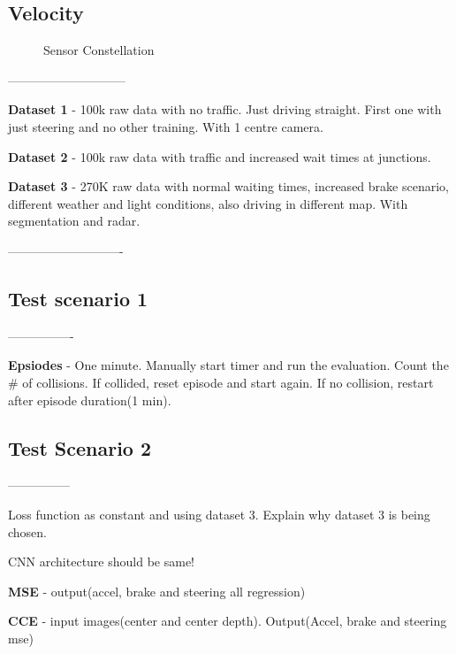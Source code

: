 \subsection{Velocity}






\begin{figure}
	\centering
    \def\svgwidth{\textwidth}
    \caption{Sensor Constellation}
    \label{fig:simplesensorconstellation}
\end{figure}

\iffalse
-----------------------------

\textbf{Dataset 1} - 100k raw data with no traffic. Just driving straight. First one with just steering and no other training.  With 1 centre camera.

\textbf{Dataset 2} - 100k raw data with traffic and increased wait times at junctions.

\textbf{Dataset 3} - 270K raw data with normal waiting times, increased brake scenario, different weather and light conditions, also driving in different map. With segmentation and radar.

----------------------------

\subsection{Test scenario 1}

----------------

\textbf{Epsiodes} - One minute. Manually start timer and run the evaluation. Count the \# of collisions. If collided, reset episode and start again. If no collision, restart after episode duration(1 min).


\subsection{Test Scenario 2}

---------------

Loss function as constant and using dataset 3. Explain why dataset 3 is being chosen.

CNN architecture should be same!

\textbf{MSE} - output(accel, brake and steering all regression)

\textbf{CCE} - input images(center and center depth). Output(Accel, brake and steering mse)


